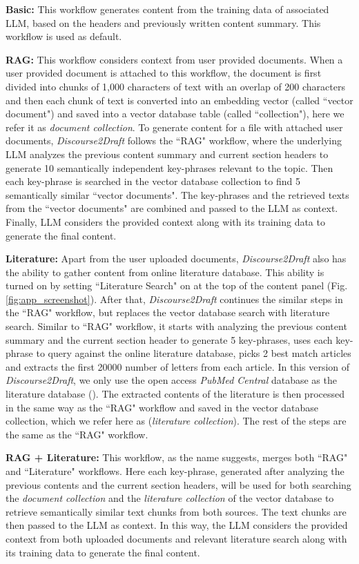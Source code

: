 \documentclass[utf8]{FrontiersinHarvard} %
\newcommand{\appname}{\emph{Discourse2Draft}}
\newcommand{\chunkWindowSize}{1,000}
\newcommand{\chunkWindowOverlap}{200}
\newcommand{\numKeyPhrases}{10}
\newcommand{\numDocsRAG}{5}
\newcommand{\numKeyPhrasesLitSearch}{5}
\newcommand{\maxContentSizePerLiterature}{20000}
\newcommand{\maxNumLiterature}{2}
\begin{document}
\textbf{Basic:} This workflow generates content from the training data of associated LLM, based on the headers and previously written content summary. This workflow is used as default.

\textbf{RAG:} This workflow considers context from user provided documents. When a user provided document is attached to this workflow, the document is first divided into chunks of \chunkWindowSize{} characters of text with an overlap of \chunkWindowOverlap{} characters and then each chunk of text is converted into an embedding vector (called ``vector document") and saved into a vector database table (called ``collection"), here we refer it as \emph{document collection}. To generate content for a file with attached user documents, \appname{} follows the ``RAG" workflow, where the underlying LLM analyzes the previous content summary and current section headers to generate \numKeyPhrases{} semantically independent key-phrases relevant to the topic. Then each key-phrase is searched in the vector database collection to find \numDocsRAG{} semantically similar ``vector documents". The key-phrases and the retrieved texts from the ``vector documents" are combined and passed to the LLM as context. Finally, LLM considers the provided context along with its training data to generate the final content.

\textbf{Literature:} Apart from the user uploaded documents, \appname{} also has the ability to gather content from online literature database. This ability is turned on by setting ``Literature Search" on at the top of the content panel (Fig. \ref{fig:app_screenshot}). After that, \appname{} continues the similar steps in the ``RAG" workflow, but replaces the vector database search with literature search. Similar to ``RAG" workflow, it starts with analyzing the previous content summary and the current section header to generate \numKeyPhrasesLitSearch{} key-phrases, uses each key-phrase to query against the online literature database, picks \maxNumLiterature{} best match articles and extracts the first \maxContentSizePerLiterature{} number of letters from each article. In this version of \appname{}, we only use the open access \emph{PubMed Central} database as the literature database (\citep{roberts2001pubmed}). The extracted contents of the literature is then processed in the same way as the ``RAG" workflow and saved in the vector database collection, which we refer here as (\emph{literature collection}). The rest of the steps are the same as the ``RAG" workflow.

\textbf{RAG + Literature:} This workflow, as the name suggests, merges both ``RAG" and ``Literature" workflows. Here each key-phrase, generated after analyzing the previous contents and the current section headers, will be used for both searching the \emph{document collection} and the \emph{literature collection} of the vector database to retrieve semantically similar text chunks from both sources. The text chunks are then passed to the LLM as context. In this way, the LLM considers the provided context from both uploaded documents and relevant literature search along with its training data to generate the final content.
\end{document}
